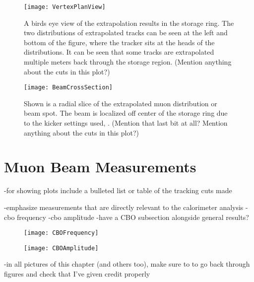 \begin{figure}[]
    \centering
    \texttt{[image: VertexPlanView]}
    \caption[Birds eye view of extrapolation in ring]{A birds eye view of the extrapolation results in the storage ring. The two distributions of extrapolated tracks can be seen at the left and bottom of the figure, where the tracker sits at the heads of the distributions. It can be seen that some tracks are extrapolated multiple meters back through the storage region. (Mention anything about the cuts in this plot?)}    
    \label{fig:VertexPlanView}
\end{figure}

\begin{figure}[]
  \centering
  \texttt{[image: BeamCrossSection]}
    \caption[Extrapolated muon beam distribution cross-section]{Shown is a radial slice of the extrapolated muon distribution or beam spot. The beam is localized off center of the storage ring due to the kicker settings used, . (Mention that last bit at all? Mention anything about the cuts in this plot?)}
    \label{fig:BeamCrossSection}
\end{figure}








\section{Muon Beam Measurements}
\label{sec:MuonBeamMeasurements}

-for showing plots include a bulleted list or table of the tracking cuts made

-emphasize measurements that are directly relevant to the calorimeter \wa analysis
-cbo frequency
-cbo amplitude
-have a CBO subsection alongside general results? 





\begin{figure}[]
    \centering
    \texttt{[image: CBOFrequency]}
    \caption[CBO frequency]{}    
    \label{fig:CBOFrequency}
\end{figure}

\begin{figure}[]
    \centering
    \texttt{[image: CBOAmplitude]}
    \caption[CBO amplitude]{}    
    \label{fig:CBOAmplitude}
\end{figure}



\clearpage


-in all pictures of this chapter (and others too), make sure to to go back through figures and check that I've given credit properly



